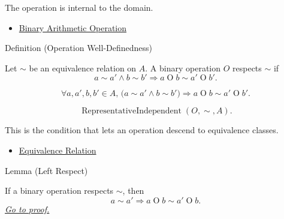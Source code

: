 \begin{remark*}[Interpretation]
The operation is internal to the domain.
\end{remark*}

\begin{dependencies}
\begin{itemize}
  \item \hyperref[def:binary-arithmetic-operation]{Binary Arithmetic Operation}
\end{itemize}
\end{dependencies}

\begin{definitionbox}{Definition (Operation Well-Definedness)}
\begin{definition}
\label{def:operation-well-definedness}
Let $\sim$ be an equivalence relation on $A$. A binary operation $O$ respects
$\sim$ if
\[
a\sim a' \land b\sim b' \Longrightarrow
a\mathbin{O}b \sim a'\mathbin{O}b'.
\]
\end{definition}
\end{definitionbox}

\begin{remark*}
\[
\forall a,a',b,b'\in A,\,
\bigl(a\sim a'\land b\sim b'\bigr)
\Longrightarrow
a\mathbin{O}b \sim a'\mathbin{O}b'.
\]
\end{remark*}

\begin{remark*}
\[
\operatorname{RepresentativeIndependent}(O,\sim,A).
\]
\end{remark*}

\begin{remark*}[Interpretation]
This is the condition that lets an operation descend to equivalence classes.
\end{remark*}

\begin{dependencies}
\begin{itemize}
  \item \hyperref[def:equivalence-relation]{Equivalence Relation}
\end{itemize}
\end{dependencies}

\begin{lemmabox}{Lemma (Left Respect)}
\begin{lemma}
\label{lem:operation-left-respect}
If a binary operation respects $\sim$, then
\[
a\sim a' \Longrightarrow a\mathbin{O}b\sim a'\mathbin{O}b.
\]
\hyperref[prf:operation-left-respect]{\textit{Go to proof.}}
\end{lemma}
\end{lemmabox}

